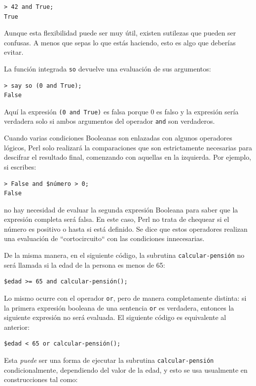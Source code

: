 \begin{lstlisting}
> 42 and True;
True
\end{lstlisting}
%
Aunque esta flexibilidad puede ser muy útil, existen 
sutilezas que pueden ser confusas. A menos que sepas
lo que estás haciendo, esto es algo que deberías evitar.

La función integrada {\tt so} devuelve una evaluación 
de sus argumentos:

\begin{lstlisting}
> say so (0 and True);
False
\end{lstlisting}
%
Aquí la expresión {\tt (0 and True)} es falsa porque 0 es falso
y la expresión sería verdadera solo si ambos argumentos del operador
{\tt and} son verdaderos.

Cuando varias condiciones Booleanas son enlazadas con algunos
operadores lógicos, Perl solo realizará la comparaciones que son
estrictamente necesarias para descifrar el resultado final,
comenzando con aquellas en la izquierda. Por ejemplo, si escribes:

\begin{lstlisting}
> False and $número > 0;
False
\end{lstlisting}
%
no hay necesidad de evaluar la segunda expresión Booleana
para saber que la expresión completa será falsa. En este caso,
Perl no trata de chequear si el número es positivo o hasta si
está definido. Se dice que estos operadores realizan una evaluación
de ``cortocircuito`` con las condiciones innecesarias.

De la misma manera, en el siguiente código, la subrutina 
{\tt calcular-pensión} no será llamada si la edad de la persona
es menos de 65:

\begin{lstlisting}
$edad >= 65 and calcular-pensión();
\end{lstlisting}
%
Lo mismo ocurre con el operador {\tt or}, pero de
manera completamente distinta: si la primera expresión booleana
de una sentencia {\tt or} es verdadera, entonces la siguiente
expresión no será evaluada. El siguiente código es equivalente
al anterior:

\begin{lstlisting}
$edad < 65 or calcular-pensión();
\end{lstlisting}
% 
Esta \emph{puede} ser una forma de ejecutar la subrutina
{\tt calcular-pensión} condicionalmente, dependiendo del 
valor de la edad, y esto se usa usualmente en construcciones
tal como:


